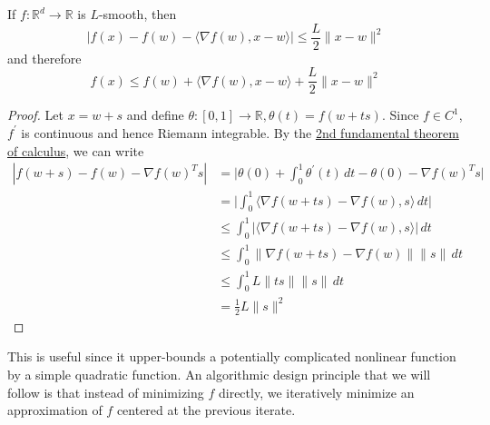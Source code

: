	\begin{theorem}
	  \label{thm:taylors-1st-order-bound}
		If $f: \mathbb{R}^d \to \mathbb{R}$ is $L$-smooth, then 
		\begin{equation}
			|f(x) - f(w) - \langle \nabla f(w), x - w \rangle | \leq \frac{L}{2} \|x - w\|^2
		\end{equation}
		and therefore 
		\begin{equation}
			f(x) \leq f(w) + \langle \nabla f(w), x - w \rangle + \frac{L}{2} \|x - w\|^2
		\end{equation}
	\end{theorem}
	\begin{proof}
		Let $x = w + s$ and define $\theta: [0, 1] \to \mathbb{R}, \theta(t) = f(w + ts)$. Since $f \in C^1$, $f^\prime$ is continuous and hence Riemann integrable. By the \hyperref[real-thm:ftc2]{2nd fundamental theorem of calculus}, we can write 
		\begin{align}
			|f(w + s) - f(w) - \nabla f(w)^T s| & = \bigg| \theta(0) + \int_0^1 \theta^\prime (t) \,dt - \theta(0) - \nabla f(w)^T s \bigg|  \\ 
																					& = \bigg| \int_0^1 \langle \nabla f(w + ts) - \nabla f(w), s \rangle \,dt \bigg| \\ 
																					& \leq \int_0^1 | \langle \nabla f(w + ts) - \nabla f(w), s \rangle | \,dt \\ 
																					& \leq \int_0^1 \| \nabla f(w + ts) - \nabla f(w) \| \|s\| \,dt \\ 
																					& \leq \int_0^1 L \|ts\| \|s\|\,dt \\ 
																					& = \frac{1}{2} L \|s\|^2
		\end{align}
	\end{proof}

	This is useful since it upper-bounds a potentially complicated nonlinear function by a simple quadratic function. An algorithmic design principle that we will follow is that instead of minimizing $f$ directly, we iteratively minimize an approximation of $f$ centered at the previous iterate. 

